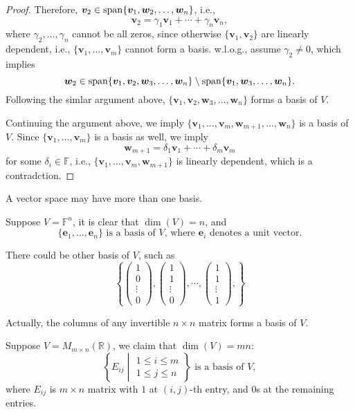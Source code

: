 \begin{proof}
Therefore, $\bm v_2\in\operatorname{span}\{\bm v_1,\bm w_2,\dots,\bm w_n\}$, i.e.,
\[
\bm v_2=\gamma_1\bm v_1+\cdots+\gamma_n\bm v_n,
\]
where $\gamma_2,\dots,\gamma_n$ cannot be all zeros, since otherwise $\{\bm v_1,\bm v_2\}$ are linearly dependent, i.e., $\{\bm v_1,\dots,\bm v_m\}$ cannot form a basis. w.l.o.g., assume $\gamma_2\ne0$, which implies
\[
\bm w_2\in\operatorname{span}\{\bm v_1,\bm v_2,\bm w_3,\dots,\bm w_n\}\setminus\operatorname{span}\{\bm v_1,\bm w_3,\dots,\bm w_n\}.
\]
Following the simlar argument above, $\{\bm v_1,\bm v_2,\bm w_3,\dots,\bm w_n\}$ forms a basis of $V$.

Continuing the argument above, we imply $\{\bm v_1,\dots,\bm v_m,\bm w_{m+1},\dots,\bm w_n\}$ is a basis of $V$. Since $\{\bm v_1,\dots,\bm v_m\}$ is a basis as well, we imply
\[
\bm w_{m+1}=\delta_1\bm v_1+\cdots+\delta_m\bm v_m
\]
 for some $\delta_i\in\mathbb{F}$, i.e., $\{\bm v_1,\dots,\bm v_m,\bm w_{m+1}\}$ is linearly dependent, which is a contradction.
\end{proof}
\begin{example}
A vector space may have more than one basis.

Suppose $V=\mathbb{F}^n$, it is clear that $\dim(V)=n$, and
\[
\text{$\{\bm e_1,\dots,\bm e_n\}$ is a basis of $V$, where $\bm e_i$ denotes a unit vector.}
\]

There could be other basis of $V$, such as
\[
\left\{
\begin{pmatrix}
1\\0\\\vdots\\0
\end{pmatrix},
\begin{pmatrix}
1\\1\\\vdots\\0
\end{pmatrix},
\cdots,
\begin{pmatrix}
1\\1\\\vdots\\1
\end{pmatrix},
\right\}
\]

Actually, the columns of any invertible $n\times n$ matrix forms a basis of $V$. 
\end{example}

\begin{example}
Suppose $V=M_{m\times n}(\mathbb{R})$, we claim that $\dim(V)=mn$:
\[
\left\{
E_{ij}\middle|
\begin{aligned}
1\le i\le m\\
1\le j\le n
\end{aligned}
\right\}
\text{ is a basis of $V$},
\]
where $E_{ij}$ is $m\times n$ matrix with $1$ at $(i,j)$-th entry, and $0$s at the remaining entries.
\end{example}


